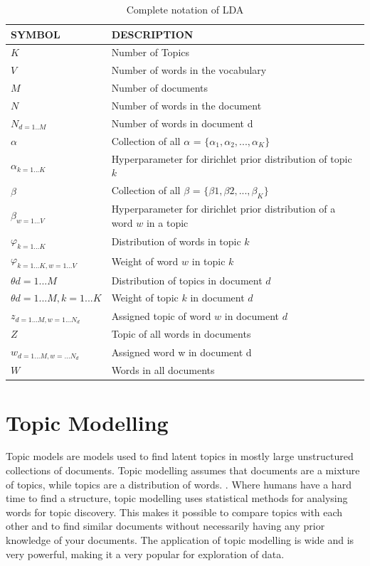 \begin{table}[h]
\centering
 \begin{tabular}{l l} 
 \hline
 SYMBOL & DESCRIPTION \\ 
 \hline
 $K$ & Number of Topics \\  
 $V$ & Number of words in the vocabulary \\
 $M$ & Number of documents \\
 $N$ & Number of words in the document \\
 $N_{d=1..M}$ & Number of words in document d\\
 $\alpha$ & Collection of all $\alpha$ = $ \{ \alpha_{1},\alpha_{2}, ... , \alpha_{K}\}$ \\
 $\alpha_{k=1...K}$ & Hyperparameter for dirichlet prior distribution of topic $k$ \\
 $\beta$ &  Collection of all $\beta$ = $\{\beta{1},\beta{2}, ... , \beta_{K}\}$ \\
 $\beta_{w=1...V}$ & Hyperparameter for dirichlet prior distribution of a word $w$ in a topic \\
 $\varphi_{k=1...K}$ & Distribution of words in topic $k$ \\
 $\varphi_{k=1...K, w=1...V}$ & Weight of  word $w$ in topic $k$  \\
 $\theta{d=1...M}$ & Distribution of topics in document $d$  \\
 $\theta{d=1...M, k=1...K}$ & Weight of  topic $k$ in document $d$ \\
 $z_{d=1...M, w=1...N_d}$ & Assigned topic of word $w$ in document $d$\\
 $Z$ & Topic of all words in documents \\
 $w_{d=1...M, w=...N_d}$ & Assigned word w in document d \\ 
 $W$ & Words in all documents \\ 

 \hline
 \end{tabular}
\caption{Complete notation of LDA}
\label{tab:table1}
\end{table}

\section{Topic Modelling}\label{lda:tm}
Topic models are models used to find latent topics in mostly large unstructured collections of documents. Topic modelling assumes that documents are a mixture of topics, while topics are a distribution of words. \cite{Blei2010}. Where humans have a hard time to find a structure, topic modelling uses statistical methods for analysing words for topic discovery. This makes it possible to compare topics with each other and to find similar documents without necessarily having any prior knowledge of your documents. The application of topic modelling is wide and is very powerful, making it a very popular for exploration of data. 

